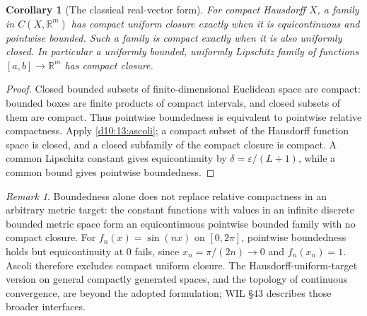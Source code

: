 \documentclass[11pt,oneside,openany]{book}
\newtheorem{corollary}[theorem]{Corollary}
\theoremstyle{definition}
\theoremstyle{remark}
\newtheorem{remark}[theorem]{Remark}
\newcommand{\R}{\mathbb R}\newcommand{\C}{\mathbb C}
\newcommand{\eps}{\varepsilon}
\begin{document}
\begin{corollary}[The classical real-vector form]\label{d10:13:classical-ascoli}
For compact Hausdorff $X$, a family in $C(X,\R^m)$ has compact uniform closure exactly when it is equicontinuous and pointwise bounded. Such a family is compact exactly when it is also uniformly closed. In particular a uniformly bounded, uniformly Lipschitz family of functions $[a,b]\to\R^m$ has compact closure.
\end{corollary}
\begin{proof}
Closed bounded subsets of finite-dimensional Euclidean space are compact: bounded boxes are finite products of compact intervals, and closed subsets of them are compact. Thus pointwise boundedness is equivalent to pointwise relative compactness. Apply \cref{d10:13:ascoli}; a compact subset of the Hausdorff function space is closed, and a closed subfamily of the compact closure is compact. A common Lipschitz constant gives equicontinuity by $\delta=\eps/(L+1)$, while a common bound gives pointwise boundedness.
\end{proof}

\begin{remark}\label{d10:13:ascoli-boundaries}
Boundedness alone does not replace relative compactness in an arbitrary metric target: the constant functions with values in an infinite discrete bounded metric space form an equicontinuous pointwise bounded family with no compact closure. For $f_n(x)=\sin(nx)$ on $[0,2\pi]$, pointwise boundedness holds but equicontinuity at $0$ fails, since $x_n=\pi/(2n)\to0$ and $f_n(x_n)=1$. Ascoli therefore excludes compact uniform closure. The Hausdorff-uniform-target version on general compactly generated spaces, and the topology of continuous convergence, are beyond the adopted formulation; WIL \S43 describes those broader interfaces.
\end{remark}
\end{document}
